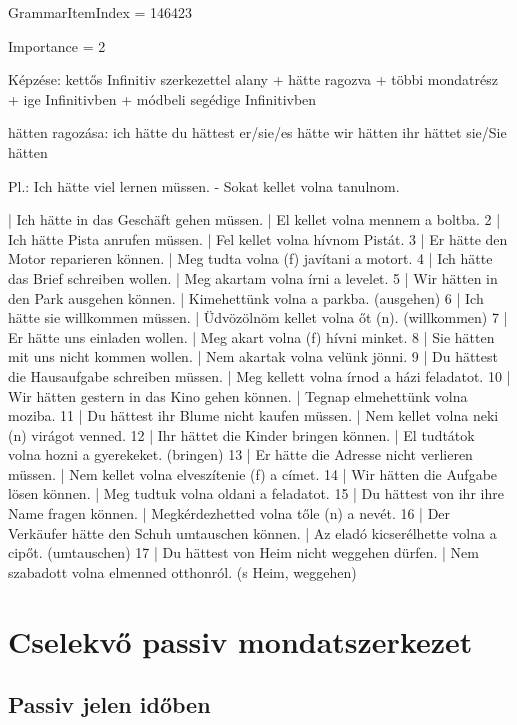 \documentclass{article}
\newenvironment{desc}{\verbatim}{\endverbatim}
\newenvironment{exmp}{\verbatim}{\endverbatim}
\begin{document}
GrammarItemIndex = 146423

Importance = 2

\begin{desc}
Képzése: kettős Infinitiv szerkezettel
alany + hätte ragozva + többi mondatrész + ige Infinitivben + módbeli segédige Infinitivben

hätten ragozása:
ich hätte
du hättest
er/sie/es hätte
wir hätten
ihr hättet
sie/Sie hätten

Pl.: Ich hätte viel lernen müssen. - Sokat kellet volna tanulnom.
\end{desc}

\begin{exmp}
1 | Ich hätte in das Geschäft gehen müssen. | El kellet volna mennem a boltba.
2 | Ich hätte Pista anrufen müssen. | Fel kellet volna hívnom Pistát.
3 | Er hätte den Motor reparieren können. | Meg tudta volna (f) javítani a motort.
4 | Ich hätte das Brief schreiben wollen. | Meg akartam volna írni a levelet.
5 | Wir hätten in den Park ausgehen können. | Kimehettünk volna a parkba. (ausgehen)
6 | Ich hätte sie willkommen müssen. | Üdvözölnöm kellet volna őt (n). (willkommen)
7 | Er hätte uns einladen wollen. | Meg akart volna (f) hívni minket.
8 | Sie hätten mit uns nicht kommen wollen. | Nem akartak volna velünk jönni.
9 | Du hättest die Hausaufgabe schreiben müssen. | Meg kellett volna írnod a házi feladatot.
10 | Wir hätten gestern in das Kino gehen können. | Tegnap elmehettünk volna moziba.
11 | Du hättest ihr Blume nicht kaufen müssen. | Nem kellet volna neki (n) virágot venned.
12 | Ihr hättet die Kinder bringen können. | El tudtátok volna hozni a gyerekeket. (bringen)
13 | Er hätte die Adresse nicht verlieren müssen. | Nem kellet volna elveszítenie (f) a címet.
14 | Wir hätten die Aufgabe lösen können. | Meg tudtuk volna oldani a feladatot.
15 | Du hättest von ihr ihre Name fragen können. | Megkérdezhetted volna tőle (n) a nevét.
16 | Der Verkäufer hätte den Schuh umtauschen können. | Az eladó kicserélhette volna a cipőt. (umtauschen)
17 | Du hättest von Heim nicht weggehen dürfen. | Nem szabadott volna elmenned otthonról. (s Heim, weggehen)
\end{exmp}

\section{Cselekvő passiv mondatszerkezet}

\subsection{Passiv jelen időben}
\end{document}

